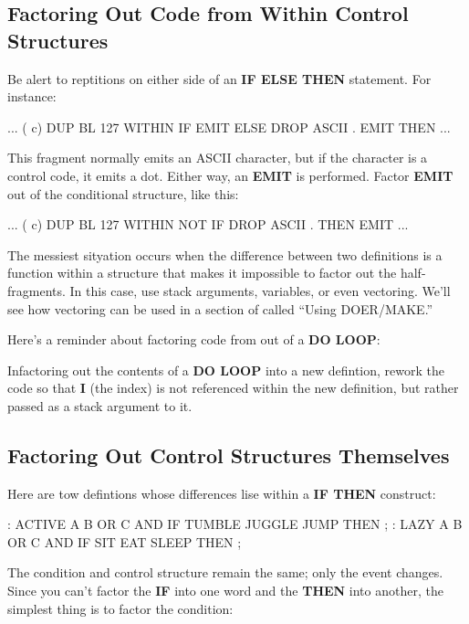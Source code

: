 \subsection{{Factoring Out Code from Within Control Structures}}

Be alert to reptitions on either side of an \textbf{IF ELSE THEN} statement. For instance:

\begin{Code}
... ( c)  DUP  BL 127 WITHIN
       IF  EMIT  ELSE
       DROP  ASCII . EMIT   THEN ...
\end{Code}
This fragment normally emits an ASCII character, but if the character is a control code, it emits a dot. Either way, an \textbf{EMIT} is performed. Factor \textbf{EMIT} out of the conditional structure, like this:

\begin{Code}
... ( c)  DUP  BL 127 WITHIN NOT
       IF  DROP  ASCII .  THEN  EMIT  ...
\end{Code}
The messiest sityation occurs when the difference between two definitions is a function within a structure that makes it impossible to factor out the half-fragments. In this case, use stack arguments, variables, or even vectoring. We'll see how vectoring can be used in a section of  called ``Using DOER/MAKE.''

Here's a reminder about factoring code from out of a \textbf{DO LOOP}:

\begin{tip}
Infactoring out the contents of a \textbf{DO LOOP} into a new defintion, rework the code so that \textbf{I} (the index) is not referenced within the new definition, but rather passed as a stack argument to it.
\end{tip}

\subsection{{Factoring Out Control Structures Themselves}}

Here are tow defintions whose differences lise within a \textbf{IF THEN} construct:

\begin{Code}
: ACTIVE    A B OR  C AND  IF  TUMBLE JUGGLE JUMP THEN ;
: LAZY      A B OR  C AND  IF   SIT  EAT  SLEEP   THEN ;
\end{Code}
The condition and control structure remain the same; only the event changes. Since you can't factor the \textbf{IF} into one word and the \textbf{THEN} into another, the simplest thing is to factor the condition:

